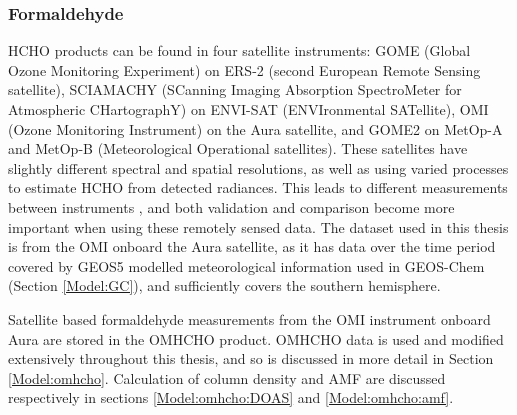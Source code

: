     
    
    
    
    \subsubsection{Formaldehyde}
      
      HCHO products can be found in four satellite instruments: GOME (Global Ozone Monitoring Experiment) on ERS-2 (second European Remote Sensing satellite), SCIAMACHY (SCanning Imaging Absorption SpectroMeter for Atmospheric CHartographY) on ENVI-SAT (ENVIronmental SATellite), OMI (Ozone Monitoring Instrument) on the Aura satellite, and GOME2 on MetOp-A and MetOp-B (Meteorological Operational satellites).
      These satellites have slightly different spectral and spatial resolutions, as well as using varied processes to estimate HCHO from detected radiances.
      This leads to different measurements between instruments \parencite{Lorente2017}, and both validation and comparison become more important when using these remotely sensed data.
      The dataset used in this thesis is from the OMI onboard the Aura satellite, as it has data over the time period covered by GEOS5 modelled meteorological information used in GEOS-Chem (Section \ref{Model:GC}), and sufficiently covers the southern hemisphere.
      
      Satellite based formaldehyde measurements from the OMI instrument onboard Aura are stored in the OMHCHO product.
      OMHCHO data is used and modified extensively throughout this thesis, and so is discussed in more detail in Section \ref{Model:omhcho}.
      Calculation of column density and AMF are discussed respectively in sections \ref{Model:omhcho:DOAS} and \ref{Model:omhcho:amf}.
      
      
